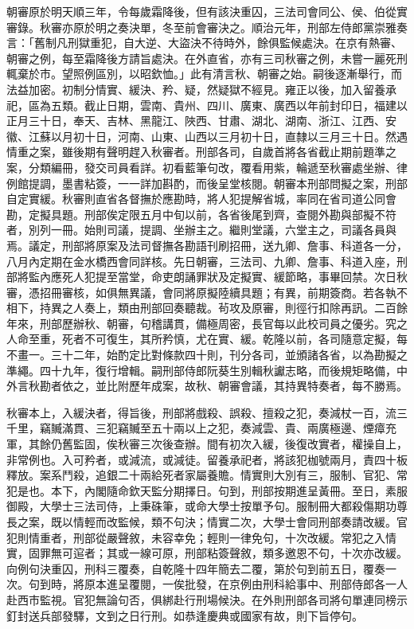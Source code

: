 \begin{pinyinscope}
朝審原於明天順三年，令每歲霜降後，但有該決重囚，三法司會同公、侯、伯從實審錄。秋審亦原於明之奏決單，冬至前會審決之。順治元年，刑部左侍郎黨崇雅奏言：「舊制凡刑獄重犯，自大逆、大盜決不待時外，餘俱監候處決。在京有熱審、朝審之例，每至霜降後方請旨處決。在外直省，亦有三司秋審之例，未嘗一麗死刑輒棄於市。望照例區別，以昭欽恤。」此有清言秋、朝審之始。嗣後逐漸舉行，而法益加密。初制分情實、緩決、矜、疑，然疑獄不經見。雍正以後，加入留養承祀，區為五類。截止日期，雲南、貴州、四川、廣東、廣西以年前封印日，福建以正月三十日，奉天、吉林、黑龍江、陜西、甘肅、湖北、湖南、浙江、江西、安徽、江蘇以月初十日，河南、山東、山西以三月初十日，直隸以三月三十日。然遇情重之案，雖後期有聲明趕入秋審者。刑部各司，自歲首將各省截止期前題準之案，分類編冊，發交司員看詳。初看藍筆句改，覆看用紫，輪遞至秋審處坐辦、律例館提調，墨書粘簽，一一詳加斟酌，而後呈堂核閱。朝審本刑部問擬之案，刑部自定實緩。秋審則直省各督撫於應勘時，將人犯提解省城，率同在省司道公同會勘，定擬具題。刑部俟定限五月中旬以前，各省後尾到齊，查閱外勘與部擬不符者，別列一冊。始則司議，提調、坐辦主之。繼則堂議，六堂主之，司議各員與焉。議定，刑部將原案及法司督撫各勘語刊刷招冊，送九卿、詹事、科道各一分，八月內定期在金水橋西會同詳核。先日朝審，三法司、九卿、詹事、科道入座，刑部將監內應死人犯提至當堂，命吏朗誦罪狀及定擬實、緩節略，事畢回禁。次日秋審，憑招冊審核，如俱無異議，會同將原擬陸續具題；有異，前期簽商。若各執不相下，持異之人奏上，類由刑部回奏聽裁。茍攻及原審，則徑行扣除再訊。二百餘年來，刑部歷辦秋、朝審，句稽講貫，備極周密，長官每以此校司員之優劣。究之人命至重，死者不可復生，其所矜慎，尤在實、緩。乾隆以前，各司隨意定擬，每不畫一。三十二年，始酌定比對條款四十則，刊分各司，並頒諸各省，以為勘擬之準繩。四十九年，復行增輯。嗣刑部侍郎阮葵生別輯秋讞志略，而後規矩略備，中外言秋勘者依之，並比附歷年成案，故秋、朝審會議，其持異特奏者，每不勝焉。

秋審本上，入緩決者，得旨後，刑部將戲殺、誤殺、擅殺之犯，奏減杖一百，流三千里，竊贓滿貫、三犯竊贓至五十兩以上之犯，奏減雲、貴、兩廣極邊、煙瘴充軍，其餘仍舊監固，俟秋審三次後查辦。間有初次入緩，後復改實者，權操自上，非常例也。入可矜者，或減流，或減徒。留養承祀者，將該犯枷號兩月，責四十板釋放。案系鬥殺，追銀二十兩給死者家屬養贍。情實則大別有三，服制、官犯、常犯是也。本下，內閣隨命欽天監分期擇日。句到，刑部按期進呈黃冊。至日，素服御殿，大學士三法司侍，上秉硃筆，或命大學士按單予句。服制冊大都殺傷期功尊長之案，既以情輕而改監候，類不句決；情實二次，大學士會同刑部奏請改緩。官犯則情重者，刑部從嚴聲敘，未容幸免；輕則一律免句，十次改緩。常犯之入情實，固罪無可逭者；其或一線可原，刑部粘簽聲敘，類多邀恩不句，十次亦改緩。向例句決重囚，刑科三覆奏，自乾隆十四年簡去二覆，第於句到前五日，覆奏一次。句到時，將原本進呈覆閱，一俟批發，在京例由刑科給事中、刑部侍郎各一人赴西市監視。官犯無論句否，俱綁赴行刑場候決。在外則刑部各司將句單連同榜示釘封送兵部發驛，文到之日行刑。如恭逢慶典或國家有故，則下旨停句。


\end{pinyinscope}
